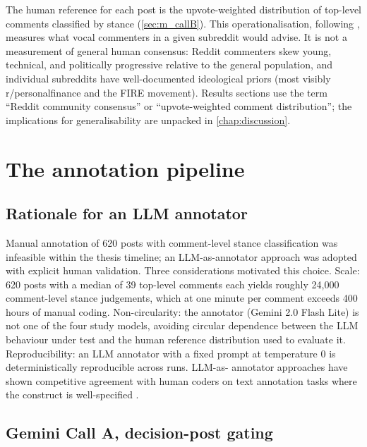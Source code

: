 The human reference for each post is the upvote-weighted distribution
of top-level comments classified by stance (\cref{sec:m_callB}). This
operationalisation, following \citet{sachdeva-2025-aita}, measures what
vocal commenters in a given subreddit would advise. It is not a
measurement of general human consensus: Reddit commenters skew young,
technical, and politically progressive relative to the general
population, and individual subreddits have well-documented ideological
priors (most visibly r/personalfinance and the FIRE movement). Results
sections use the term ``Reddit community consensus'' or
``upvote-weighted comment distribution''; the implications for
generalisability are unpacked in \cref{chap:discussion}.

\section{The annotation pipeline}
\label{sec:m_annotation}

\subsection{Rationale for an LLM annotator}
\label{sec:m_annotator_rationale}

Manual annotation of 620 posts with comment-level stance classification
was infeasible within the thesis timeline; an LLM-as-annotator approach
was adopted with explicit human validation. Three considerations
motivated this choice. Scale: 620 posts with a median of 39 top-level
comments each yields roughly 24,000 comment-level stance judgements,
which at one minute per comment exceeds 400 hours of manual coding.
Non-circularity: the annotator (Gemini 2.0 Flash Lite) is not one of
the four study models, avoiding circular dependence between the LLM
behaviour under test and the human reference distribution used to
evaluate it. Reproducibility: an LLM annotator with a fixed prompt at
temperature 0 is deterministically reproducible across runs. LLM-as-
annotator approaches have shown competitive agreement with human coders
on text annotation tasks where the construct is well-specified
\citep{gilardi-2023-llm-annotator, ziems-2024-llm-coder}.

\subsection{Gemini Call A, decision-post gating}
\label{sec:m_callA}

